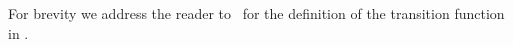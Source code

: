 For brevity we address the reader to~\cite{baral2015action} for the definition of the transition function in \mAL.
%
%
%
